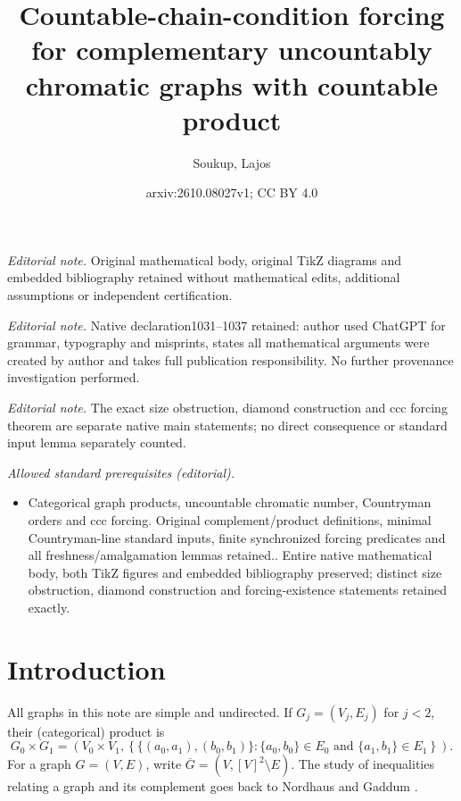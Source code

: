 \documentclass[10pt,a4paper]{amsart}
\title{Countable-chain-condition forcing for complementary uncountably chromatic graphs with countable product}
\author{Soukup, Lajos}
\date{arxiv:2610.08027v1; CC BY 4.0}
\numberwithin{equation}{section}
\theoremstyle{definition}
\theoremstyle{remark}
\begin{document}
\maketitle
\noindent\textit{Editorial note.} Original mathematical body, original TikZ diagrams and embedded bibliography retained without mathematical edits, additional assumptions or independent certification.\par\medskip
\noindent\textit{Editorial note.} Native declaration1031--1037 retained: author used ChatGPT for grammar, typography and misprints, states all mathematical arguments were created by author and takes full publication responsibility. No further provenance investigation performed.\par\medskip
\noindent\textit{Editorial note.} The exact size obstruction, diamond construction and ccc forcing theorem are separate native main statements; no direct consequence or standard input lemma separately counted.\par\medskip
\noindent\textit{Allowed standard prerequisites (editorial).}\begin{itemize}
\item Categorical graph products, uncountable chromatic number, Countryman orders and ccc forcing. Original complement/product definitions, minimal Countryman-line standard inputs, finite synchronized forcing predicates and all freshness/amalgamation lemmas retained.. Entire native mathematical body, both TikZ figures and embedded bibliography preserved; distinct size obstruction, diamond construction and forcing-existence statements retained exactly.
\end{itemize}\medskip
\section{Introduction}

All graphs in this note are simple and undirected.  If
$G_j=(V_j,E_j)$ for $j<2$, their (categorical) product is
\begin{displaymath}
 G_0\times G_1=
 \left(V_0\times V_1,
 \left\{\{(a_0,a_1),(b_0,b_1)\}:
       \{a_0,b_0\}\in E_0\text{ and }\{a_1,b_1\}\in E_1
 \right\}\right).
\end{displaymath}
For a graph $G=(V,E)$, write
$\overline G=(V,[V]^2\setminus E)$.  The study of inequalities relating
a graph and its complement goes back to Nordhaus and Gaddum
\cite{NordhausGaddum1956}.
\end{document}
